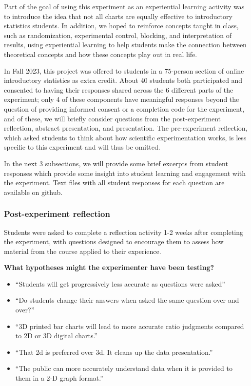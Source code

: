 \documentclass[runningheads
]{llncs}
\providecommand{\tightlist}{%
  \setlength{\itemsep}{0pt}\setlength{\parskip}{0pt}}\usepackage{longtable,booktabs,array}
\begin{document}
Part of the goal of using this experiment as an experiential learning
activity was to introduce the idea that not all charts are equally
effective to introductory statistics students. In addition, we hoped to
reinforce concepts taught in class, such as randomization, experimental
control, blocking, and interpretation of results, using experiential
learning to help students make the connection between theoretical
concepts and how these concepts play out in real life.

In Fall 2023, this project was offered to students in a 75-person
section of online introductory statistics as extra credit. About 40
students both participated and consented to having their responses
shared across the 6 different parts of the experiment; only 4 of these
components have meaningful responses beyond the question of providing
informed consent or a completion code for the experiment, and of these,
we will briefly consider questions from the post-experiment reflection,
abstract presentation, and presentation. The pre-experiment reflection,
which asked students to think about how scientific experimentation
works, is less specific to this experiment and will thus be omitted.

In the next 3 subsections, we will provide some brief excerpts from
student responses which provide some insight into student learning and
engagement with the experiment. Text files with all student responses
for each question are available on github.

\subsubsection{Post-experiment
reflection}\label{post-experiment-reflection}

Students were asked to complete a reflection activity 1-2 weeks after
completing the experiment, with questions designed to encourage them to
assess how material from the course applied to their experience.

\textbf{What hypotheses might the experimenter have been testing?}

\begin{itemize}
\tightlist
\item
  ``Students will get progressively less accurate as questions were
  asked''
\item
  ``Do students change their answers when asked the same question over
  and over?''
\item
  ``3D printed bar charts will lead to more accurate ratio judgments
  compared to 2D or 3D digital charts.''
\item
  ``That 2d is preferred over 3d. It cleans up the data presentation.''
\item
  ``The public can more accurately understand data when it is provided
  to them in a 2-D graph format.''
\end{itemize}
\end{document}

